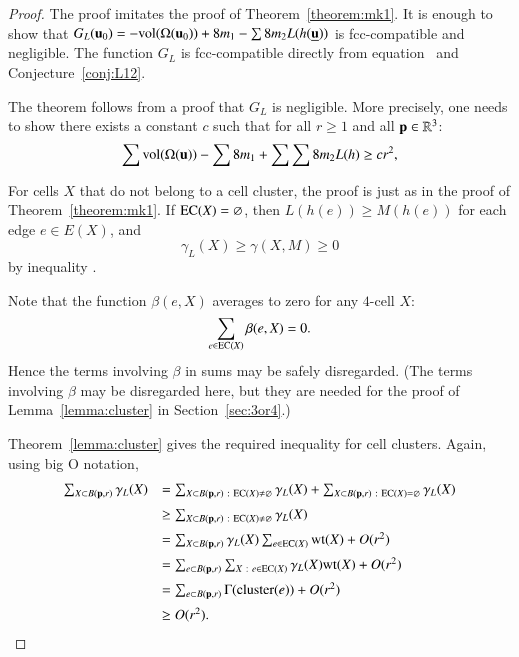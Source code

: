 \begin{proof}  The proof imitates the proof of Theorem~\ref{theorem:mk1}.
It is enough to show that $G_L( {\mathbf u}_0)  = -{\operatorname{vol}}(\Omega( {\mathbf u}_0)) + 8 m_1 - \sum 8 m_2 L(h({\underline{{\mathbf u}}}))$ is fcc-compatible and negligible. 
The function $G_L$  is fcc-compatible directly
from equation~
and Conjecture~\ref{conj:L12}.  

The theorem follows from a proof that $G_L$ is negligible.  More precisely, one needs
to show there exists a constant  $c$ such that for all $r\ge 1$ and all ${\mathbf p}\in\mathbb{R}^3$:
\begin{equation}\label{eqn:A2neg}
  \sum {\operatorname{vol}}(\Omega( {\mathbf u})) -\sum 8m_1 + \sum \sum 8 m_2 L(h) \ge c r^2,
\end{equation}

For cells $X$ that do not belong to a cell cluster,
the proof is just as in the proof of Theorem~\ref{theorem:mk1}.
If ${\operatorname{EC}}(X)=\varnothing$, then 
$L(h(e))\ge M(h(e))$ for each edge $e\in E(X)$, and
\begin{displaymath}\gamma_L(X)\ge \gamma(X,M)\ge 0\end{displaymath} 
by inequality .

Note that the function $\beta(e,X)$ averages to zero for any $4$-cell $X$:
\begin{displaymath}
\sum_{e\in {\operatorname{EC}}(X)} \beta(e,X) = 0.
\end{displaymath}
Hence the terms involving $\beta$ in sums may be safely disregarded.  (The terms involving
$\beta$ may be disregarded here, but they are needed for the proof of Lemma~\ref{lemma:cluster}  in Section~\ref{sec:3or4}.)

Theorem~\ref{lemma:cluster} gives the required inequality for cell clusters.
Again, using big O notation, 
\begin{displaymath}
\begin{array}{lll}
\sum_{X\subset B(\p,r)} \gamma_L(X) &= 
\sum_{X\subset B(\p,r)\mid \op{EC}(X)\ne\emptyset} \gamma_L(X) +
\sum_{X\subset B(\p,r)\mid \op{EC}(X)=\emptyset} \gamma_L(X) \vspace{6pt}\\
&\ge \sum_{X\subset B(\p,r)\mid \op{EC}(X)\ne\emptyset} \gamma_L(X)\vspace{6pt} \\
&=\sum_{X\subset B(\p,r)}\gamma_L(X)\sum_{e \in \op{EC}(X)}\op{wt}(X) + O(r^2)\vspace{6pt}\\
&=\sum_{e\subset B(\p,r)}\sum_{X\mid e \in \op{EC}(X)}\gamma_L(X)\op{wt}(X) + O(r^2)\vspace{6pt}\\
&=\sum_{e\subset B(\p,r)}\Gamma(\op{cluster}(e)) + O(r^2)\vspace{6pt}\\
&\ge O(r^2).
\end{array}
\end{displaymath}


\end{proof}
